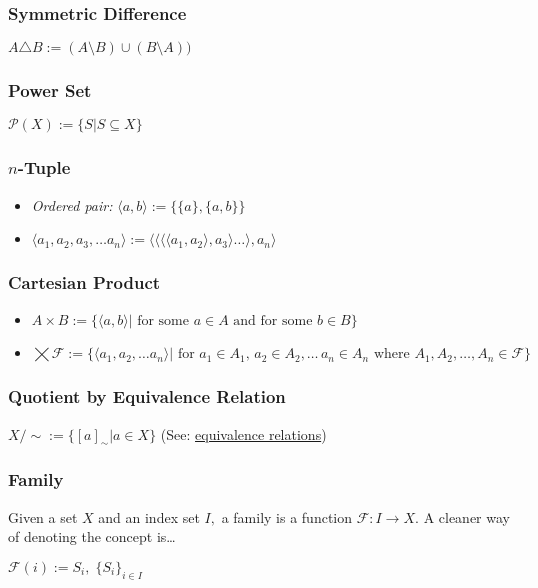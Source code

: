 \subsubsection{Symmetric Difference}\label{symmetricdifference}
$A \ensuremath{\triangle} B := (A \setminus B) \cup (B \setminus A))$
	
\subsubsection{Power Set}\label{powerset}
$\mathcal{P}(X) := \{S |S \subseteq X\}$
	
\subsubsection{$n$-Tuple}\label{tuble}
\begin{itemize}
  \item \emph{Ordered pair:} $\langle a,b \rangle := \{\{a\}, \{a,b\}\}$
  \item $\langle a_1,a_2,a_3,\dots a_n \rangle := \langle \langle \langle \langle a_1, a_2 \rangle, a_3 \rangle \dots \rangle, a_n\rangle$
\end{itemize}
		
\subsubsection{Cartesian Product}\label{cartesianproduct}
\begin{itemize}
  \item $A \times B := \{ \langle a,b \rangle | \textrm{ for some }a\in A \textrm{ and for some } b \in B\}$
  \item \mbox{$\bigtimes \mathcal{F} := \{ \langle a_1,a_2, \dots a_n \rangle | \textrm{ for }a_1\in A_1, \, a_2 \in A_2, \dots \, a_n \in A_n \textrm{ where } A_1,A_2,\dots,A_n \in \mathcal{F}\}$}
\end{itemize}
			
\subsubsection{Quotient by Equivalence Relation}\label{equivalencequotient}
$X / \sim := \{[a]_{\sim} | a \in X \}$ (See: \hyperref[equivalencerelation]{equivalence relations})

\subsubsection{Family}\label{family}
Given a set $X$ and an index set $I,$ a family is a function $\mathcal{F} : I \rightarrow X.$ A cleaner way of denoting the concept is\dots \newline

$\mathcal{F}(i) := S_i, \; \{S_i\}_{i \in I}$